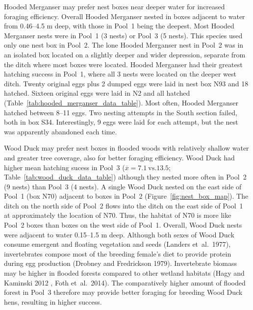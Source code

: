 Hooded Merganser may prefer nest boxes near deeper water for increased foraging efficiency. Overall Hooded Merganser nested in boxes adjacent to water from 0.46–4.5 m deep, with those in Pool~1 being the deepest.  Most Hooded Merganser nests were in Pool~1 (3 nests) or Pool~3 (5 nests). This species used only one nest box in Pool~2. The lone Hooded Merganser nest in Pool~2 was in an isolated box located on a slightly deeper and wider depression, separate from the ditch where most boxes were located. Hooded Merganser had their greatest hatching success in Pool~1, where all 3 nests were located on the deeper west ditch. Twenty original eggs plus 2 dumped eggs were laid in nest box N93 and 18 hatched.  Sixteen original eggs were laid in N2 and all hatched (Table~\ref{tab:hooded_merganser_data_table}).  Most often, Hooded Merganser hatched between 8–11 eggs. Two nesting attempts in the South section failed, both in box S34. Interestingly, 9 eggs were laid for each attempt, but the nest was apparently abandoned each time. 

Wood Duck may prefer nest boxes in flooded woods with relatively shallow water and greater tree coverage, also for better foraging efficiency.  Wood Duck had higher mean hatching sucess in Pool~3 ($\overline{x} = 7.1~\mathrm{vs.} 13.5$; Table~\ref{tab:wood_duck_data_table}) although they nested more often in Pool~2 (9 nests) than Pool~3 (4 nests).   A single Wood Duck nested on the east side of Pool~1 (box N70) adjacent to boxes in Pool~2 (Figure~\ref{fig:nest_box_map}). The ditch on the north side of Pool~2 flows into the ditch on the east side of Pool~1 at approximately the location of N70. Thus, the habitat of N70 is more like Pool~2 boxes than boxes on the west side of Pool~1. Overall, Wood Duck nests were adjacent to water 0.15–1.5 m deep.   Although both sexes of Wood Duck consume emergent and floating vegetation and seeds (Landers et~al.~1977), invertebrates compose most of the breeding female’s diet to provide protein during egg production (Drobney and Fredrickson 1979). Invertebrate biomass may be higher in flooded forests compared to other wetland habitats (Hagy and Kaminski 2012 , Foth et~al.~2014). The comparatively higher amount of flooded forest in Pool~3 therefore may provide better foraging for breeding Wood Duck hens, resulting in higher success.  


